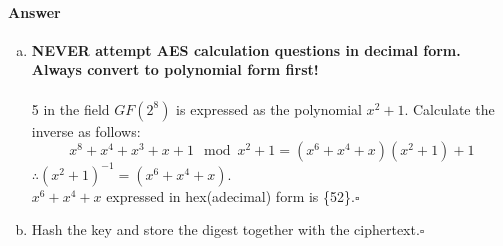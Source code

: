 \documentclass[12pt]{article}
\newcommand{\EOQ}{\hfill $\square$}
\begin{document}
\paragraph{Answer}
\begin{enumerate}[(a)]
\item 
\textbf{NEVER attempt AES calculation questions in decimal form. Always convert to polynomial form first!}\\\\
5 in the field $GF(2^8)$ is expressed as the polynomial $x^2+1$. Calculate the inverse as follows:
\begin{equation*}
x^8+x^4+x^3+x+1\mod x^2+1=(x^6+x^4+x)(x^2+1)+1
\end{equation*}
$\therefore (x^2+1)^{-1}=(x^6+x^4+x)$.\\
$x^6+x^4+x$ expressed in hex(adecimal) form is \{52\}.\EOQ
\item Hash the key and store the digest together with the ciphertext.\EOQ
\end{enumerate}
\end{document}
